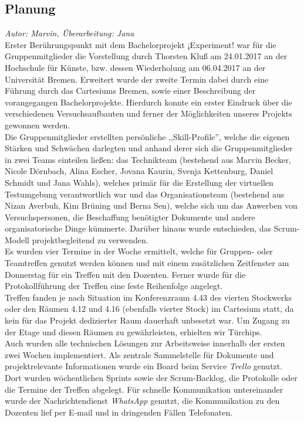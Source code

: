 \documentclass{Bericht}
\begin{document}
\subsection{Planung} %
\textit{Autor: Marvin, Überarbeitung: Jana}\\
		Erster Berührungspunkt mit dem Bachelorprojekt ¡Experiment! war für die Gruppenmitglieder die Vorstellung durch Thorsten Kluß am 24.01.2017 an der Hochschule für Künste, bzw. dessen Wiederholung am 06.04.2017 an der Universität Bremen. Erweitert wurde der zweite Termin dabei durch eine Führung durch das Cartesiums Bremen, sowie einer Beschreibung der vorangegangen Bachelorprojekte. Hierdurch konnte ein erster Eindruck über die verschiedenen Versuchsaufbauten und ferner der Möglichkeiten unseres Projekts gewonnen werden.\\
Die Gruppenmitglieder erstellten persönliche ,,Skill-Profile'', welche die eigenen Stärken und Schwächen darlegten und anhand derer sich die Gruppenmitglieder in zwei Teams einteilen ließen: das Technikteam (bestehend aus Marvin Becker, Nicole Dörnbach, Alina Escher, Jovana Kaurin, Svenja Kettenburg, Daniel Schmidt und Jana Wahls), welches primär für die Erstellung der virtuellen Testumgebung verantwortlich war und das Organisationsteam (bestehend aus Nizan Averbuh, Kim Brüning und Berna Sen), welche sich um das Anwerben von Versuchspersonen, die Beschaffung benötigter Dokumente und andere organisatorische Dinge kümmerte.
Darüber hinaus wurde entschieden, das Scrum-Modell projektbegleitend zu verwenden.\\
Es wurden vier Termine in der Woche ermittelt, welche für Gruppen- oder Teamtreffen genutzt werden können und mit einem zusätzlichen Zeitfenster am Donnerstag für ein Treffen mit den Dozenten. Ferner wurde für die Protokollführung der Treffen eine feste Reihenfolge angelegt.\\
Treffen fanden je nach Situation im Konferenzraum 4.43 des vierten Stockwerks oder den Räumen 4.12 und 4.16 (ebenfalls vierter Stock) im Cartesium statt, da kein für das Projekt dedizierter Raum dauerhaft unbesetzt war. Um Zugang zu der Etage und diesen Räumen zu gewährleisten, erhielten wir Türchips.\\
Auch wurden alle technischen Lösungen zur Arbeitsweise innerhalb der ersten zwei Wochen implementiert. Als zentrale Sammelstelle für Dokumente und projektrelevante Informationen wurde ein Board beim Service \textit{Trello} genutzt. Dort wurden wöchentlichen Sprints sowie der Scrum-Backlog, die Protokolle oder die Termine der Treffen abgelegt. Für schnelle Kommunikation untereinander wurde der Nachrichtendienst \textit{WhatsApp} genutzt, die Kommunikation zu den Dozenten lief per E-mail und in dringenden Fällen Telefonaten.\\
\end{document}
